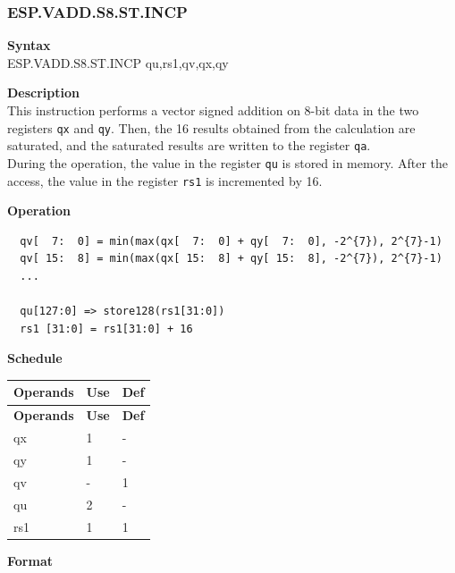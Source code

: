 \newpage
\subsubsection{ESP.VADD.S8.ST.INCP}\label{instruction:ESPVADDS8STINCP}
\textbf{Syntax}\\
ESP.VADD.S8.ST.INCP qu,rs1,qv,qx,qy

\textbf{Description}\\
This instruction performs a vector signed addition on 8-bit data in the two registers \lstinline{qx} and \lstinline{qy}. Then, the 16 results obtained from the calculation are saturated, and the saturated results are written to the register \lstinline{qa}. \\ During the operation, the value in the register \lstinline{qu} is stored in memory. After the access, the value in the register \lstinline{rs1} is incremented by 16.

\textbf{Operation}\\
\begin{lstlisting}
  qv[  7:  0] = min(max(qx[  7:  0] + qy[  7:  0], -2^{7}), 2^{7}-1)
  qv[ 15:  8] = min(max(qx[ 15:  8] + qy[ 15:  8], -2^{7}), 2^{7}-1)
  ...

  qu[127:0] => store128(rs1[31:0])
  rs1 [31:0] = rs1[31:0] + 16
\end{lstlisting}

\textbf{Schedule}\\
\begin{longtable}[c]{|l|l|l|}
    \hline
    \rowcolor{lightgray}
    \textbf{Operands} & \textbf{Use} & \textbf{Def} \\\hline
    \endfirsthead
    \hline
    \rowcolor{lightgray}
     \textbf{Operands} & \textbf{Use} & \textbf{Def} \\\hline
    \endhead
    \hline
    \endfoot

    qx & 1 & - \\\hline
  qy & 1 & - \\\hline
     qv & - & 1 \\\hline
     qu & 2 & - \\\hline
     rs1 & 1 & 1

\end{longtable}

\textbf{Format}\\

